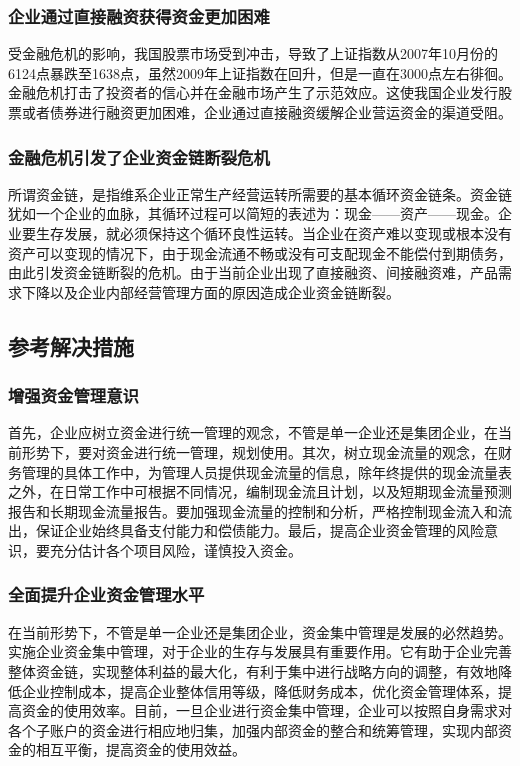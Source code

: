     \subsubsection {企业通过直接融资获得资金更加困难}

    受金融危机的影响，我国股票市场受到冲击，导致了上证指数从2007年10月份的6124点暴跌至1638点，虽然2009年上证指数在回升，但是一直在3000点左右徘徊。金融危机打击了投资者的信心并在金融市场产生了示范效应。这使我国企业发行股票或者债券进行融资更加困难，企业通过直接融资缓解企业营运资金的渠道受阻。

    \subsubsection {金融危机引发了企业资金链断裂危机}

    所谓资金链，是指维系企业正常生产经营运转所需要的基本循环资金链条。资金链犹如一个企业的血脉，其循环过程可以简短的表述为：现金——资产——现金。企业要生存发展，就必须保持这个循环良性运转。当企业在资产难以变现或根本没有资产可以变现的情况下，由于现金流通不畅或没有可支配现金不能偿付到期债务，由此引发资金链断裂的危机。由于当前企业出现了直接融资、间接融资难，产品需求下降以及企业内部经营管理方面的原因造成企业资金链断裂。

\subsection {参考解决措施}

    \subsubsection {增强资金管理意识}

    首先，企业应树立资金进行统一管理的观念，不管是单一企业还是集团企业，在当前形势下，要对资金进行统一管理，规划使用。其次，树立现金流量的观念，在财务管理的具体工作中，为管理人员提供现金流量的信息，除年终提供的现金流量表之外，在日常工作中可根据不同情况，编制现金流且计划，以及短期现金流量预测报告和长期现金流量报告。要加强现金流量的控制和分析，严格控制现金流入和流出，保证企业始终具备支付能力和偿债能力。最后，提高企业资金管理的风险意识，要充分估计各个项目风险，谨慎投入资金。

    \subsubsection {全面提升企业资金管理水平}

    在当前形势下，不管是单一企业还是集团企业，资金集中管理是发展的必然趋势。实施企业资金集中管理，对于企业的生存与发展具有重要作用。它有助于企业完善整体资金链，实现整体利益的最大化，有利于集中进行战略方向的调整，有效地降低企业控制成本，提高企业整体信用等级，降低财务成本，优化资金管理体系，提高资金的使用效率。目前，一旦企业进行资金集中管理，企业可以按照自身需求对各个子账户的资金进行相应地归集，加强内部资金的整合和统筹管理，实现内部资金的相互平衡，提高资金的使用效益。

